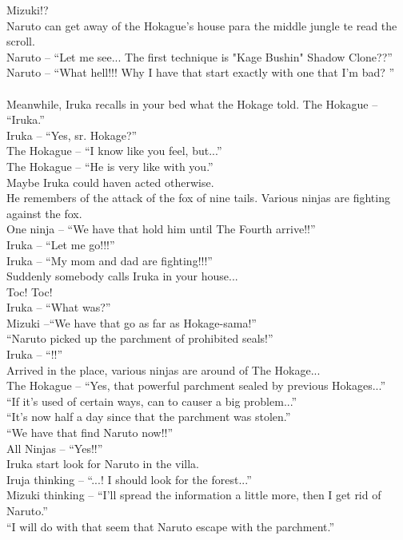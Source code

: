 \documentclass[
10pt,				%
openright,			%
oneside,			%
a5paper,			%
brazil,				%
french,				%
english,			%
sumario=tradicional
]{abntex2}
\begin{document}
Mizuki!?\\
Naruto can get away of the Hokague's house para the middle jungle te read the scroll.\\
Naruto -- \enquote{Let me  see... The first technique is "Kage Bushin" Shadow Clone??}\\
Naruto -- \enquote{What hell!!! Why I have that start exactly with one that I'm bad? }\\\\
Meanwhile, Iruka recalls in your bed what the Hokage told.
The Hokague -- \enquote{Iruka.}\\
Iruka -- \enquote{Yes, sr. Hokage?}\\
The Hokague -- \enquote{I know 	like you feel, but...}\\
The Hokague -- \enquote{He is very like with you.}\\
Maybe Iruka could haven acted otherwise.\\

He remembers of the attack of the fox of nine tails. Various ninjas are fighting against the fox.\\
One ninja -- \enquote{We have that hold him until The Fourth arrive!!} \\
Iruka -- \enquote{Let me go!!!}\\
Iruka -- \enquote{My mom and dad are fighting!!!}\\

Suddenly  somebody calls Iruka in your house...\\
Toc! Toc!\\
Iruka -- \enquote{What was?}\\
Mizuki --\enquote{We have that go as far as  Hokage-sama!}\\
\enquote{Naruto picked up the parchment of prohibited seals!}\\
Iruka -- \enquote{!!}\\
Arrived in the place, various ninjas are around of The Hokage...\\
The Hokague -- \enquote{Yes, that powerful parchment sealed by previous Hokages...}\\
 \enquote{If it's used of certain ways, can to causer a big problem...}\\
 
\enquote{It's now half a day since that the parchment was stolen.}\\
\enquote{We have that find Naruto now!!}\\
All Ninjas -- \enquote{Yes!!}\\
Iruka start look for  Naruto in the villa.\\
Iruja thinking -- \enquote{...! I should look for the forest...}\\
Mizuki thinking -- \enquote{I'll spread the information a little more, then I get rid  of Naruto.}\\
\enquote{I will do with that seem that Naruto escape with the parchment.}\\
 
\end{document}
